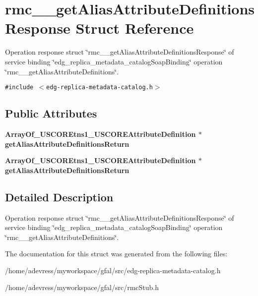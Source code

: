 \section{rmc\_\-\_\-get\-Alias\-Attribute\-Definitions\-Response Struct Reference}
\label{structrmc____getAliasAttributeDefinitionsResponse}
Operation response struct \char`\"{}rmc\_\-\_\-get\-Alias\-Attribute\-Definitions\-Response\char`\"{} of service binding \char`\"{}edg\_\-replica\_\-metadata\_\-catalog\-Soap\-Binding\char`\"{} operation \char`\"{}rmc\_\-\_\-get\-Alias\-Attribute\-Definitions\char`\"{}.  


{\tt \#include $<$edg-replica-metadata-catalog.h$>$}

\subsection*{Public Attributes}
\begin{CompactItemize}
\item 
\bf{Array\-Of\_\-USCOREtns1\_\-USCOREAttribute\-Definition} $\ast$ \textbf{get\-Alias\-Attribute\-Definitions\-Return}\label{structrmc____getAliasAttributeDefinitionsResponse_70a2dd4392019aa5cf8552d5a35fff98}

\item 
\bf{Array\-Of\_\-USCOREtns1\_\-USCOREAttribute\-Definition} $\ast$ \textbf{get\-Alias\-Attribute\-Definitions\-Return}\label{structrmc____getAliasAttributeDefinitionsResponse_70a2dd4392019aa5cf8552d5a35fff98}

\end{CompactItemize}


\subsection{Detailed Description}
Operation response struct \char`\"{}rmc\_\-\_\-get\-Alias\-Attribute\-Definitions\-Response\char`\"{} of service binding \char`\"{}edg\_\-replica\_\-metadata\_\-catalog\-Soap\-Binding\char`\"{} operation \char`\"{}rmc\_\-\_\-get\-Alias\-Attribute\-Definitions\char`\"{}. 



The documentation for this struct was generated from the following files:\begin{CompactItemize}
\item 
/home/adevress/myworkspace/gfal/src/edg-replica-metadata-catalog.h\item 
/home/adevress/myworkspace/gfal/src/rmc\-Stub.h\end{CompactItemize}

